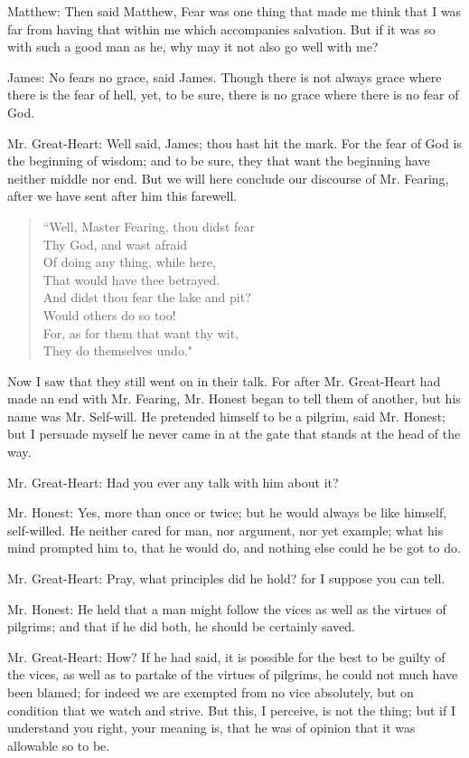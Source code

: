 Matthew: Then said Matthew, Fear was one thing that made me think that I was far from having that within me which accompanies salvation. But if it was so with such a good man as he, why may it not also go well with me?

James: No fears no grace, said James. Though there is not always grace where there is the fear of hell, yet, to be sure, there is no grace where there is no fear of God.

Mr. Great-Heart: Well said, James; thou hast hit the mark. For the fear of God is the beginning of wisdom; and to be sure, they that want the beginning have neither middle nor end. But we will here conclude our discourse of Mr. Fearing, after we have sent after him this farewell.
\begin{verse}
``Well, Master Fearing, thou didst fear\\
Thy God, and wast afraid\\
Of doing any thing, while here,\\
That would have thee betrayed.\\
And didst thou fear the lake and pit?\\
Would others do so too!\\
For, as for them that want thy wit,\\
They do themselves undo."\\
\end{verse}

Now I saw that they still went on in their talk. For after Mr. Great-Heart had made an end with Mr. Fearing, Mr. Honest began to tell them of another, but his name was Mr. Self-will. He pretended himself to be a pilgrim, said Mr. Honest; but I persuade myself he never came in at the gate that stands at the head of the way.

Mr. Great-Heart: Had you ever any talk with him about it?

Mr. Honest: Yes, more than once or twice; but he would always be like himself, self-willed. He neither cared for man, nor argument, nor yet example; what his mind prompted him to, that he would do, and nothing else could he be got to do.

Mr. Great-Heart: Pray, what principles did he hold? for I suppose you can tell.

Mr. Honest: He held that a man might follow the vices as well as the virtues of pilgrims; and that if he did both, he should be certainly saved.

Mr. Great-Heart: How? If he had said, it is possible for the best to be guilty of the vices, as well as to partake of the virtues of pilgrims, he could not much have been blamed; for indeed we are exempted from no vice absolutely, but on condition that we watch and strive. But this, I perceive, is not the thing; but if I understand you right, your meaning is, that he was of opinion that it was allowable so to be.

